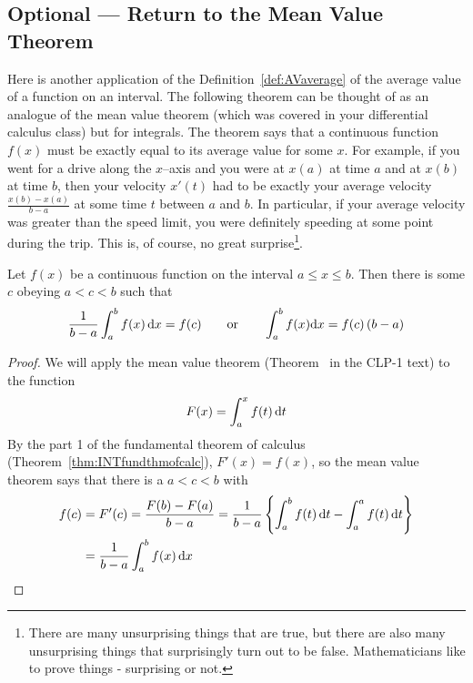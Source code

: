 \subsection*{Optional --- Return to the Mean Value Theorem}
Here is another application of the Definition~\ref{def:AVaverage} of the average value of a function on an interval. The following theorem can be
thought of as an analogue of the mean value theorem (which was covered in your
differential calculus class) but for integrals. The theorem says that a continuous function 
$f(x)$ must be exactly equal to its average value for some $x$. For example, if you
went for a drive along the $x$--axis and you were at $x(a)$ at time $a$ and at $x(b)$ at
time $b$, then your velocity $x'(t)$ had to be exactly your average velocity
$\frac{x(b)-x(a)}{b-a}$ at some time $t$ between $a$ and $b$. In particular,
if your average velocity was greater than the speed limit, you were definitely
speeding at some point during the trip. This is, of course, no great 
surprise\footnote{There are many unsurprising things that are true, but there are also many
unsurprising things that surprisingly turn out to be false. Mathematicians like to
prove things - surprising or not.}.

\begin{theorem}\label{thm:AVmvt}
Let $f(x)$ be a continuous function on the interval $a\le x\le b$.
Then there is some $c$ obeying $a < c < b$ such that
\begin{align*}
\frac{1}{b-a}\int_a^b f(x)\,\mathrm{d}x=f(c) \qquad\text{or}\qquad
\int_a^b f(x)\mathrm{d}x = f(c)\,(b-a)
\end{align*}
\end{theorem}

\begin{proof}
We will apply the mean value theorem (Theorem~ in the CLP-1 text) to
the function
\begin{equation*}
F(x) = \int_a^x f(t)\,\mathrm{d}t
\end{equation*}
By the part 1 of the fundamental theorem of calculus 
(Theorem~\ref{thm:INTfundthmofcalc}),
$F'(x)=f(x)$, so the mean value theorem says that there is a $a<c<b$ with
\begin{align*}
f(c) &= F'(c) = \frac{F(b)-F(a)}{b-a}
=\frac{1}{b-a}\left\{\int_a^b f(t)\,\mathrm{d}t-\int_a^a f(t)\,\mathrm{d}t\right\}
\\
&=\frac{1}{b-a}\int_a^b f(x)\,\mathrm{d}x
\end{align*}
\end{proof}

